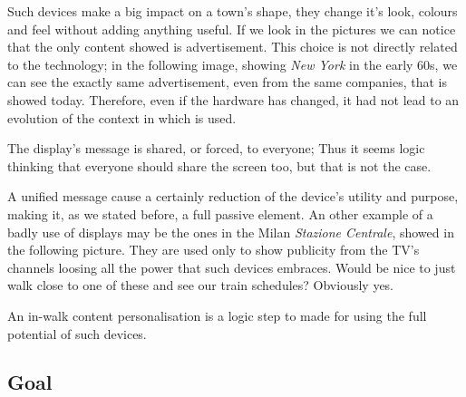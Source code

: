 \documentclass[]{usiinfbachelorproject}
\begin{document}
Such devices make a big impact on a town's shape, they change it's look, colours and feel without adding anything useful. If we look in the pictures we can notice that the only content showed is advertisement. This choice is not directly related to the technology; in the following image, showing \emph{New York} in the early 60s, we can see the exactly same advertisement, even from the same companies, that is showed today. Therefore, even if the hardware has changed, it had not lead to an evolution of the context in which is used.
\begin{figure}[H]
  \centering
\end{figure} 
The display's message is shared, or forced, to everyone; Thus it seems logic thinking that everyone should share the screen too, but that is not the case.

A unified message cause a certainly reduction of the device's utility and purpose, making it, as we stated before, a full passive element. An other example of a badly use of displays may be the ones in the Milan \emph{Stazione Centrale}, showed in the following picture.
They are used only to show publicity from the TV's channels loosing all the power that such devices embraces. Would be nice to just walk close to one of these and see our train schedules? Obviously yes.

An in-walk content personalisation is a logic step to made for using the full potential of such devices.
\subsection{Goal}
\end{document}
